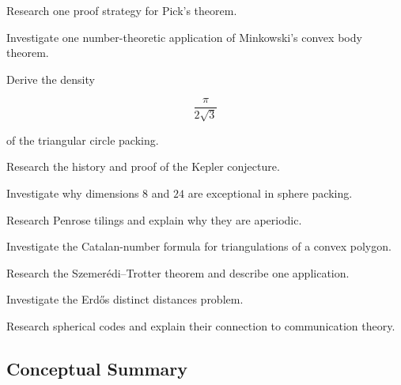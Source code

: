 \begin{exercise}[4]
Research one proof strategy for Pick's theorem.
\end{exercise}

\begin{exercise}[4]
Investigate one number-theoretic application of Minkowski's convex body
theorem.
\end{exercise}

\begin{exercise}[4]
Derive the density

\[
\frac{\pi}{2\sqrt3}
\]

of the triangular circle packing.
\end{exercise}

\begin{exercise}[4]
Research the history and proof of the Kepler conjecture.
\end{exercise}

\begin{exercise}[4]
Investigate why dimensions \(8\) and \(24\) are exceptional in sphere
packing.
\end{exercise}

\begin{exercise}[4]
Research Penrose tilings and explain why they are aperiodic.
\end{exercise}

\begin{exercise}[4]
Investigate the Catalan-number formula for triangulations of a convex
polygon.
\end{exercise}

\begin{exercise}[4]
Research the Szemer\'edi--Trotter theorem and describe one application.
\end{exercise}

\begin{exercise}[4]
Investigate the Erd\H{o}s distinct distances problem.
\end{exercise}

\begin{exercise}[4]
Research spherical codes and explain their connection to communication
theory.
\end{exercise}

\subsection{Conceptual Summary}
\label{subsec:discrete-geometry-summary}

